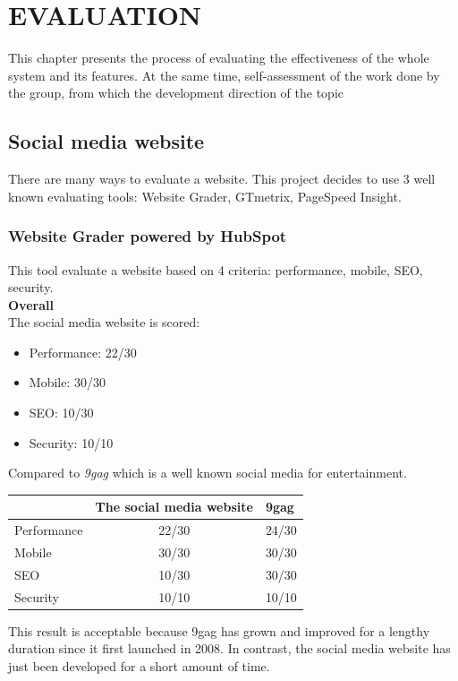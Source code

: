 \chapter{EVALUATION}

This chapter presents the process of evaluating the effectiveness of the whole system and its features. At the same time, self-assessment of the work done by the group, from which the development direction of the topic
\section{Social media website}
There are many ways to evaluate a website. This project decides to use 3 well known evaluating tools: Website Grader, GTmetrix, PageSpeed Insight.
\subsection{Website Grader powered by HubSpot}
This tool evaluate a website based on 4 criteria: performance, mobile, SEO, security.\\
\textbf{Overall}\\
The social media website is scored:
\begin{itemize}
\item Performance: 22/30
\item Mobile: 30/30
\item SEO: 10/30
\item Security: 10/10
\end{itemize}
Compared to \textit{9gag} which is a well known social media for entertainment. 
\begin{table}[H]
\begin{tabular}{|l|c|l|}
\hline
            & \multicolumn{1}{l|}{The social media website} & 9gag  \\ \hline
Performance & 22/30                                         & 24/30 \\ \hline
Mobile      & 30/30                                         & 30/30 \\ \hline
SEO         & 10/30                                         & 30/30 \\ \hline
Security    & 10/10                                         & 10/10 \\ \hline
\end{tabular}
\end{table}
This result is acceptable because 9gag has grown and improved for a lengthy duration since it first launched in 2008. In contrast, the social media website has just been developed for a short amount of time.\\
